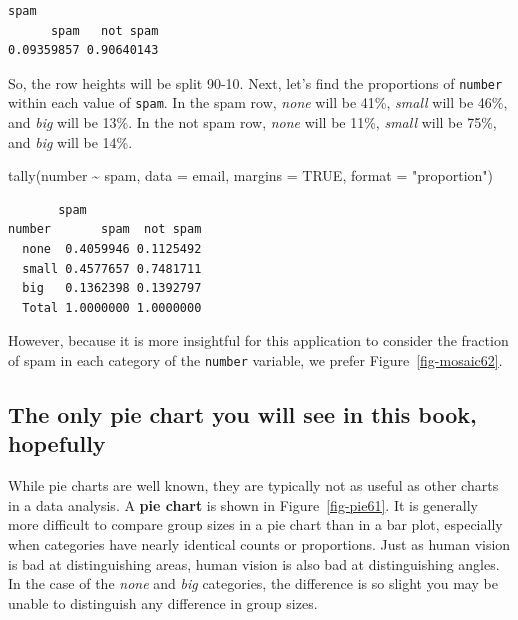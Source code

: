 \documentclass[
  letterpaper,
  DIV=11,
  numbers=noendperiod]{scrreprt}
\newenvironment{Shaded}{\begin{snugshade}}{\end{snugshade}}
\newcommand{\AttributeTok}[1]{\textcolor[rgb]{0.40,0.45,0.13}{#1}}
\newcommand{\ConstantTok}[1]{\textcolor[rgb]{0.56,0.35,0.01}{#1}}
\newcommand{\DecValTok}[1]{\textcolor[rgb]{0.68,0.00,0.00}{#1}}
\newcommand{\FloatTok}[1]{\textcolor[rgb]{0.68,0.00,0.00}{#1}}
\newcommand{\FunctionTok}[1]{\textcolor[rgb]{0.28,0.35,0.67}{#1}}
\newcommand{\NormalTok}[1]{\textcolor[rgb]{0.00,0.23,0.31}{#1}}
\newcommand{\SpecialCharTok}[1]{\textcolor[rgb]{0.37,0.37,0.37}{#1}}
\newcommand{\StringTok}[1]{\textcolor[rgb]{0.13,0.47,0.30}{#1}}
\begin{document}
\begin{verbatim}
spam
      spam   not spam 
0.09359857 0.90640143 
\end{verbatim}

So, the row heights will be split 90-10. Next, let's find the
proportions of \texttt{number} within each value of \texttt{spam}. In
the spam row, \emph{none} will be 41\%, \emph{small} will be 46\%, and
\emph{big} will be 13\%. In the not spam row, \emph{none} will be 11\%,
\emph{small} will be 75\%, and \emph{big} will be 14\%.

\begin{Shaded}
\begin{Highlighting}[]
\FunctionTok{tally}\NormalTok{(number }\SpecialCharTok{\textasciitilde{}}\NormalTok{ spam, }\AttributeTok{data =}\NormalTok{ email, }\AttributeTok{margins =} \ConstantTok{TRUE}\NormalTok{, }\AttributeTok{format =} \StringTok{"proportion"}\NormalTok{)}
\end{Highlighting}
\end{Shaded}

\begin{verbatim}
       spam
number       spam  not spam
  none  0.4059946 0.1125492
  small 0.4577657 0.7481711
  big   0.1362398 0.1392797
  Total 1.0000000 1.0000000
\end{verbatim}

However, because it is more insightful for this application to consider
the fraction of spam in each category of the \texttt{number} variable,
we prefer Figure~\ref{fig-mosaic62}.

\subsection{The only pie chart you will see in this book,
hopefully}\label{the-only-pie-chart-you-will-see-in-this-book-hopefully}

While pie charts are well known, they are typically not as useful as
other charts in a data analysis. A \textbf{pie chart} is shown in
Figure~\ref{fig-pie61}. It is generally more difficult to compare group
sizes in a pie chart than in a bar plot, especially when categories have
nearly identical counts or proportions. Just as human vision is bad at
distinguishing areas, human vision is also bad at distinguishing angles.
In the case of the \emph{none} and \emph{big} categories, the difference
is so slight you may be unable to distinguish any difference in group
sizes.

\begin{Shaded}
\end{Shaded}
\end{document}
